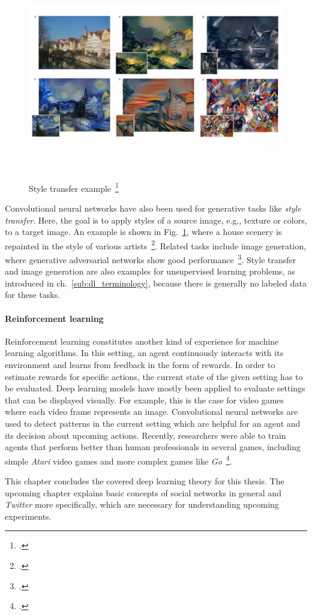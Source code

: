 \begin{figure}[h]
  \includegraphics[height=9cm]{img/style_transfer.jpg}
  \caption[Style transfer example]{Style transfer example~\footcite{Gatys2015}}
\label{fig:style_transfer}
\end{figure}

Convolutional neural networks have also been used for generative tasks like
\textit{style transfer}.
Here, the goal is to apply styles of a source image, e.g., texture or colors,
to a target image.
An example is shown in Fig.~\ref{fig:style_transfer}, where a house scenery is
repainted in the style of various artists~\footcite{Gatys2015}.
Related tasks include image generation, where generative adversarial networks
show good performance~\footcite{Radford2015}.
Style transfer and image generation are also examples for unsupervised learning
problems, as introduced in ch.~\ref{sub:dl_terminology}, because there is
generally no labeled data for these tasks.

\paragraph{Reinforcement learning}
\label{sub:dl_app_rl}

Reinforcement learning constitutes another kind of experience for machine
learning algorithms.
In this setting, an agent continuously interacts with its environment and learns
from feedback in the form of rewards.
In order to estimate rewards for specific actions, the current state of the
given setting has to be evaluated.
Deep learning models have mostly been applied to evaluate settings that can
be displayed visually.
For example, this is the case for video games where each video frame represents an image.
Convolutional neural networks are used to detect patterns in the current
setting which are helpful for an agent and its decision about upcoming
actions.
Recently, researchers were able to train agents that perform better than human
professionals in several games, including simple \textit{Atari} video games
and more complex games like \textit{Go}~\footcite{Mnih2015, Silver2016}.

This chapter concludes the covered deep learning theory for this thesis.
The upcoming chapter explains basic concepts of social networks in general and
\textit{Twitter} more specifically, which are necessary for understanding
upcoming experiments.
